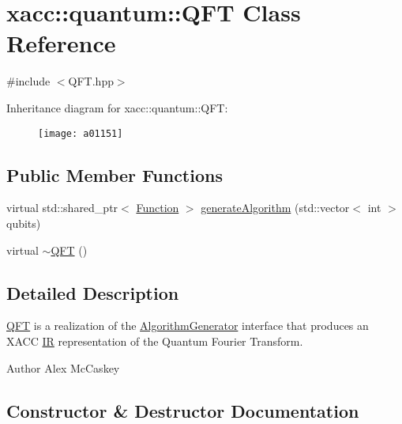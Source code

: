 \hypertarget{a01151}{}\section{xacc\+:\+:quantum\+:\+:Q\+FT Class Reference}
\label{a01151}


{\ttfamily \#include $<$Q\+F\+T.\+hpp$>$}

Inheritance diagram for xacc\+:\+:quantum\+:\+:Q\+FT\+:\begin{figure}[H]
\begin{center}
\leavevmode
\texttt{[image: a01151]}
\end{center}
\end{figure}
\subsection*{Public Member Functions}
\begin{DoxyCompactItemize}
\item 
virtual std\+::shared\+\_\+ptr$<$ \hyperlink{a01475}{Function} $>$ \hyperlink{a01151_ac093c288bc9fc069464fc3fd2cc0ac21}{generate\+Algorithm} (std\+::vector$<$ int $>$ qubits)
\item 
virtual \hyperlink{a01151_a2f585738386f9a3744498983cd1f094e}{$\sim$\+Q\+FT} ()
\end{DoxyCompactItemize}


\subsection{Detailed Description}
\hyperlink{a01151}{Q\+FT} is a realization of the \hyperlink{a01467}{Algorithm\+Generator} interface that produces an X\+A\+CC \hyperlink{a01499}{IR} representation of the Quantum Fourier Transform.

\begin{DoxyAuthor}{Author}
Alex Mc\+Caskey 
\end{DoxyAuthor}


\subsection{Constructor \& Destructor Documentation}
\mbox{\label{a01151_a2f585738386f9a3744498983cd1f094e}} 
